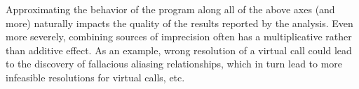 Approximating the behavior of the program along all of the above axes (and more) naturally impacts the quality of the results reported by the analysis. Even more severely, combining sources of imprecision often has a multiplicative rather than additive effect. As an example, wrong resolution of a virtual call could lead to the discovery of fallacious aliasing relationships, which in turn lead to more infeasible resolutions for virtual calls, etc.



